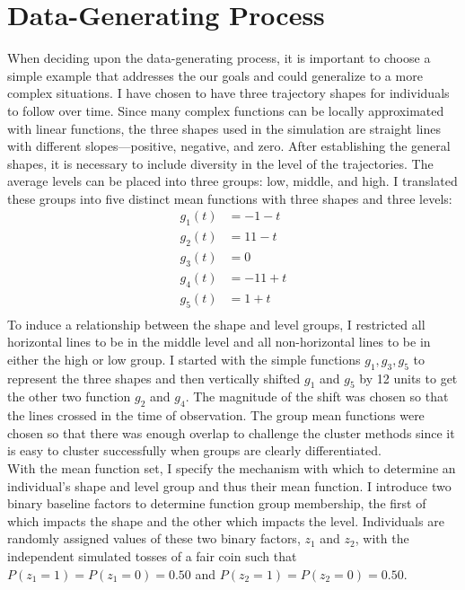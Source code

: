\section{Data-Generating Process}
When deciding upon the data-generating process, it is important to choose a simple example that addresses the our goals and could generalize to a more complex situations. I have chosen to have three trajectory shapes for individuals to follow over time. Since many complex functions can be locally approximated with linear functions, the three shapes used in the simulation are straight lines with different slopes---positive, negative, and zero. After establishing the general shapes, it is necessary to include diversity in the level of the trajectories. The average levels can be placed into three groups: low, middle, and high. I translated these groups into five distinct mean functions with three shapes and three levels:
\begin{align*}
g_{1}(t) &= -1 - t\\
g_{2}(t) &= 11 - t\\
g_{3}(t) &= 0\\
g_{4}(t) &= -11 + t\\
g_{5}(t) &= 1 + t\\
\end{align*} 
To induce a relationship between the shape and level groups, I restricted all horizontal lines to be in the middle level and all non-horizontal lines to be in either the high or low group. I started with the simple functions $g_{1}, g_{3}, g_{5}$ to represent the three shapes and then vertically shifted $g_{1}$ and $g_{5}$ by 12 units to get the other two function $g_{2}$ and $g_{4}$. The magnitude of the shift was chosen so that the lines crossed in the time of observation. The group mean functions were chosen so that there was enough overlap to challenge the cluster methods since it is easy to cluster successfully when groups are clearly differentiated.   \\

With the mean function set, I specify the mechanism with which to determine an individual's shape and level group and thus their mean function. I introduce two binary baseline factors to determine function group membership, the first of which impacts the shape and the other which impacts the level. Individuals are randomly assigned values of these two binary factors, $z_{1}$ and $z_{2}$, with the independent simulated tosses of a fair coin such that $P(z_{1}=1) = P(z_{1}=0) = 0.50$ and $P(z_{2}=1) = P(z_{2}=0)=0.50$. \\

